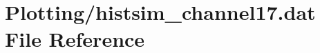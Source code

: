 \hypertarget{Plotting_2histsim__channel17_8dat}{}\section{Plotting/histsim\+\_\+channel17.dat File Reference}
\label{Plotting_2histsim__channel17_8dat}
